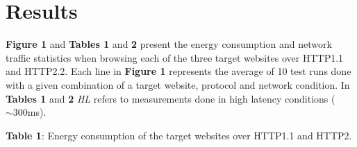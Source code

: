 \documentclass[noback]{cuposter}
\begin{document}
\section{Results}

\textbf{Figure 1} and \textbf{Tables 1} and \textbf{2} present the energy consumption and network traffic statistics when browsing each of the three target websites over HTTP1.1 and HTTP2.2. Each line in \textbf{Figure 1} represents the average of 10 test runs done with a given combination of a target website, protocol and network condition. In \textbf{Tables 1} and \textbf{2} \emph{HL} refers to measurements done in high latency conditions ($\sim300$ms).

\columnbreak

\textbf{Table 1}: Energy consumption of the target websites over HTTP1.1 and HTTP2.
\end{document}
